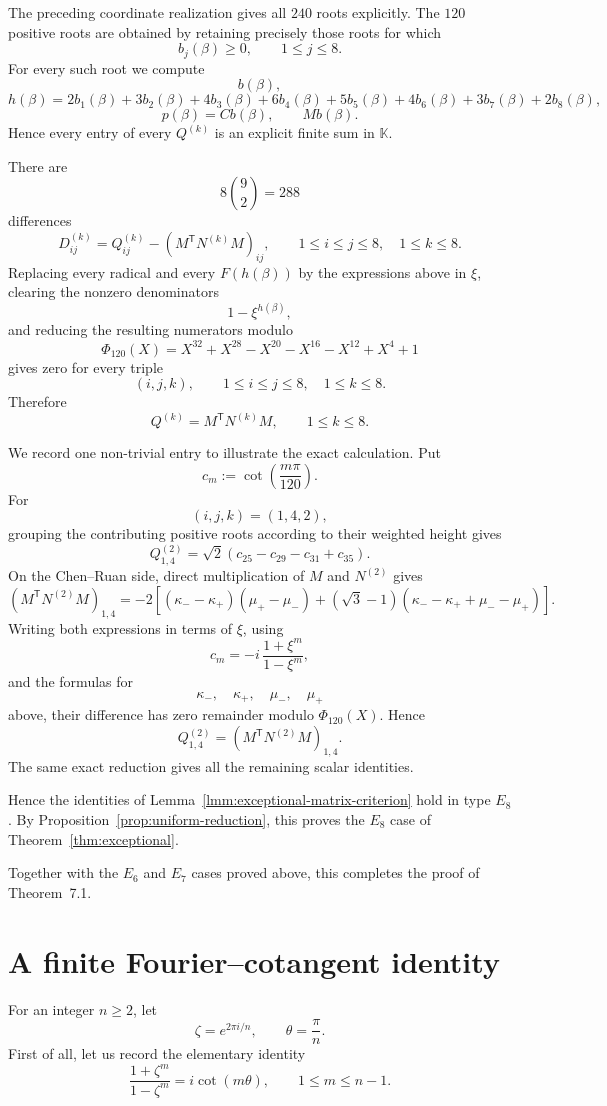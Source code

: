 \documentclass[a4paper,reqno]{amsart}
\theoremstyle{plain} %
\theoremstyle{definition} %
\theoremstyle{remark} %
\newcommand{\1}{\mathds{1}}   %
\begin{document}
The preceding coordinate realization gives all \(240\) roots
explicitly.  The \(120\) positive roots are obtained by retaining
precisely those roots for which
\[
b_j(\beta)\ge0,
\qquad
1\le j\le8.
\]
For every such root we compute
\[
b(\beta),
\]
\[
h(\beta)
=
2b_1(\beta)+3b_2(\beta)+4b_3(\beta)+6b_4(\beta)
+5b_5(\beta)+4b_6(\beta)+3b_7(\beta)+2b_8(\beta),
\]
\[
p(\beta)=Cb(\beta),
\qquad
Mb(\beta).
\]
Hence every entry of every \(Q^{(k)}\) is an explicit finite sum in
\(\mathbb K\).

There are
\[
8\binom92=288
\]
differences
\[
D_{ij}^{(k)}
=
Q_{ij}^{(k)}
-
\left(M^{\mathsf T}N^{(k)}M\right)_{ij},
\qquad
1\le i\le j\le8,
\quad
1\le k\le8.
\]
Replacing every radical and every \(F(h(\beta))\) by the expressions
above in \(\xi\), clearing the nonzero denominators
\[
1-\xi^{h(\beta)},
\]
and reducing the resulting numerators modulo
\[
\Phi_{120}(X)
=
X^{32}+X^{28}-X^{20}-X^{16}-X^{12}+X^4+1
\]
gives zero for every triple
\[
(i,j,k),
\qquad
1\le i\le j\le8,
\quad
1\le k\le8.
\]
Therefore
\[
Q^{(k)}
=
M^{\mathsf T}N^{(k)}M,
\qquad
1\le k\le8.
\]

We record one non-trivial entry to illustrate the exact calculation.
Put
\[
c_m
:=
\cot\left(\frac{m\pi}{120}\right).
\]
For
\[
(i,j,k)=(1,4,2),
\]
grouping the contributing positive roots according to their weighted
height gives
\[
Q_{1,4}^{(2)}
=
\sqrt2
\left(
c_{25}-c_{29}-c_{31}+c_{35}
\right).
\]
On the Chen--Ruan side, direct multiplication of \(M\) and \(N^{(2)}\)
gives
\[
\left(M^{\mathsf T}N^{(2)}M\right)_{1,4}
=
-2\left[
(\kappa_--\kappa_+)(\mu_+-\mu_-)
+
(\sqrt3-1)
(\kappa_--\kappa_++\mu_--\mu_+)
\right].
\]
Writing both expressions in terms of \(\xi\), using
\[
c_m
=
-i\,\frac{1+\xi^m}{1-\xi^m},
\]
and the formulas for
\[
\kappa_-,
\quad
\kappa_+,
\quad
\mu_-,
\quad
\mu_+
\]
above, their difference has zero remainder modulo
\(\Phi_{120}(X)\).  Hence
\[
Q_{1,4}^{(2)}
=
\left(M^{\mathsf T}N^{(2)}M\right)_{1,4}.
\]
The same exact reduction gives all the remaining scalar identities.

Hence the identities of
Lemma~\ref{lmm:exceptional-matrix-criterion} hold in type \(E_8\).
By Proposition~\ref{prop:uniform-reduction}, this proves the \(E_8\) case of
Theorem~\ref{thm:exceptional}.

Together with the \(E_6\) and \(E_7\) cases proved above, this completes
the proof of Theorem~7.1.


\appendix

\section{A finite Fourier--cotangent identity}
\label{app:fourier-cotangent}
For an integer $n\ge 2$, let
\[
\zeta=e^{2\pi i/n},
\qquad
\theta=\frac{\pi}{n}.
\]
First of all, let us record the elementary identity
\[
\frac{1+\zeta^m}{1-\zeta^m}
=
i\cot(m\theta),
\qquad
1\le m\le n-1.
\]
\end{document}
